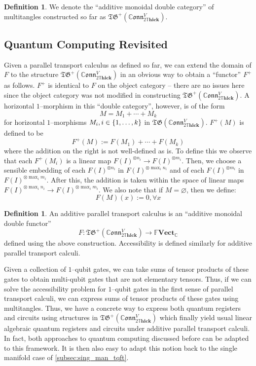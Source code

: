 \documentclass{amsart}
\newcommand{\C}{\mathbb{C}}
\newcommand{\tensor}{\otimes}
\renewcommand{\to}[1][]{\stackrel{#1}{\longrightarrow}}
\newcommand{\br}[1]{\left( #1 \right)}
\newcommand{\curly}[1]{\left\{ #1 \right\}}
\newcommand{\set}[2][]{\ifthenelse{\equal{#1}{}}
                                  {\curly{#2}}
                                  {\curly{#1\ \textbf{:}\ #2}}}
\newcommand{\FFVect}{\mathbb{F}\textbf{Vect}}
\newcommand{\DThick}{2\mathbb{T}\mathbf{hick}}
\newcommand{\TG}{\mathfrak{TG}}
\newcommand{\CConn}{\mathbb{C}\mathfrak{onn}}
\numberwithin{thm}{section}
\theoremstyle{definition}
\newtheorem{defn}[thm]{Definition}
\begin{document}
\begin{defn}
We denote the ``additive monoidal double category'' of multitangles constructed
so far as $\TG^+(\CConn^V_{\DThick})$.
\end{defn}

%

\subsection{Quantum Computing Revisited}

Given a parallel transport calculus as defined so far, we can extend the domain of
$F$ to the structure $\TG^+\br{\CConn^V_{\DThick}}$ in an obvious way to obtain
a ``functor'' $F^+$ as follows. $F^+$ is identical to $F$ on the object category
-- there are no issues here since the object category was not modified in
constructing $\TG^+\br{\CConn^V_{\DThick}}$. A horizontal $1$--morphism in this
``double category'', however, is of the form
\[
  M = M_1 + \cdots + M_k
\]
for horizontal $1$--morphisms $M_i, i \in \set{1, \dots, k}$ in
$\TG\br{\CConn^V_{\DThick}}$. $F^+(M)$ is defined to be
\[
  F^+(M) := F(M_1) + \cdots + F(M_k)
\]
where the addition on the right is not well-defined as is. To define this we
observe that each $F^+(M_i)$ is a linear map
$F(I)^{\tensor n_i} \to F(I)^{\tensor m_i}$. Then, we choose a sensible
embedding of each $F(I)^{\tensor n_i}$ in $F(I)^{\tensor \max_i n_i}$ and of
each $F(I)^{\tensor m_i}$ in $F(I)^{\tensor \max_i m_i}$. After this, the
addition is taken within the space of linear maps
$F(I)^{\tensor \max_i n_i} \to F(I)^{\tensor \max_i m_i}$. We also note that if
$M = \varnothing$, then we define:
\[
  F(M)(x) := 0, \forall x
\]

\begin{defn}
An additive parallel transport calculus is an ``additive monoidal double functor''
\[
  F : \TG^+(\CConn^V_{\DThick}) \to \FFVect_{\C}
\]
defined using the above construction.
Accessibility is defined similarly for additive parallel transport calculi.
\end{defn}

Given a collection of $1$--qubit gates, we can take sums of tensor products of
these gates to obtain multi-qubit gates that are not elementary tensors.  Thus,
if we can solve the accessibility problem for $1$--qubit gates in the first
sense of parallel transport calculi, we can express sums of tensor products of
these gates using multitangles. Thus, we have a concrete way to express both
quantum registers and circuits using structures in $\TG^+(\CConn^V_{\DThick})$
which finally yield usual linear algebraic quantum registers and circuits under
additive parallel transport calculi. In fact, both approaches to quantum computing
discussed before can be adapted to this framework. It is then also easy to adapt
this notion back to the single manifold case of \ref{subsec:sing_man_tqft}.
\end{document}
